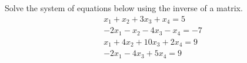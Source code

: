 Solve the system of equations below using the inverse of a matrix.
%
\begin{align*}
x_1+x_2+3x_3+x_4=5\\ 
-2x_1-x_2-4x_3-x_4=-7\\ 
x_1+4x_2+10x_3+2x_4=9\\ 
-2x_1-4x_3+5x_4=9
\end{align*}